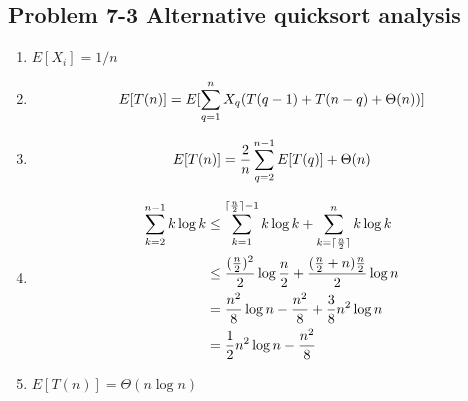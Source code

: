 \subsection*{Problem 7-3 Alternative quicksort analysis}
\begin{enumerate}
	\item	$E[X_i] = 1 / n$
	\item
		\begin{equation} \notag
			E[T(n)] = E[\sum_{q = 1}^n X_q(T(q - 1) + T(n - q) + \Theta(n))]
		\end{equation}
	\item
		\begin{equation} \notag
			E[T(n)] = \frac{2}{n} \sum_{q = 2}^{n - 1}E[T(q)] + \Theta(n)
		\end{equation}
	\item
		\begin{equation} \notag
		\begin{aligned}
			\sum_{k = 2}^{n - 1} k \log k & \leq \sum_{k = 1}^{\lceil \frac{n}{2} \rceil - 1} k \log k + \sum_{k = \lceil \frac{n}{2} \rceil}^n k \log k \\
			& \leq \frac{(\frac{n}{2})^2}{2} \log \frac{n}{2} + \frac{(\frac{n}{2} + n) \frac{n}{2}}{2} \log n \\
			& = \frac{n^2}{8} \log n - \frac{n^2}{8} + \frac{3}{8} n^2 \log n \\
			& = \frac{1}{2} n^2 \log n - \frac{n^2}{8}
		\end{aligned}
		\end{equation}
	\item	$E[T(n)] = \Theta(n \log n)$
\end{enumerate}

